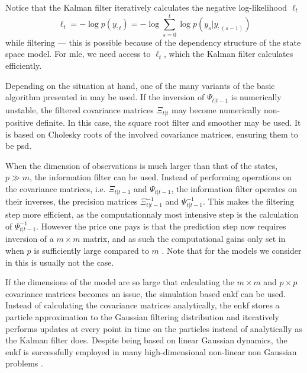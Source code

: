 Notice that the Kalman filter iteratively calculates the negative log-likelihood $\ell_{t}$  
$$\ell_{t} = - \log p(y_{:t}) = - \log \sum_{s = 0}^t \log p(y_{s} | y_{:(s - 1)})$$ 
while filtering --- this is possible because of the dependency structure of the state space model. For \acrshort{mle}, we need access to $\ell_{t}$, which the Kalman filter calculates efficiently.

Depending on the situation at hand, one of the many variants of the basic algorithm presented in  may be used. If the inversion of $\Psi_{t|t-1}$ is numerically unstable, the filtered covariance matrices $\Xi_{t|t}$ may become numerically non-positive definite. In this case, the square root filter and smoother \citep{Morf1975Squareroot} may be used. It is based on Cholesky roots of the involved covariance matrices, ensuring them to be \acrshort{psd}.

When the dimension of observations is much larger than that of the states, $p \gg m$, the information filter \citep{Fraser1969Optimum} can be used. Instead of performing operations on the covariance matrices, i.e. $\Xi_{t|t-1}$ and $\Psi_{t|t-1}$, the information filter operates on their inverses, the precision matrices $\Xi_{t|t - 1}^{-1}$ and $\Psi_{t|t-1}^{-1}$. This makes the filtering step more efficient, as the computationnaly most intensive step is the calculation of $\Psi_{t | t- 1}^{-1}$. However the price one pays is that the prediction step now requires inversion of a $m\times m$ matrix, and as such the computational gains only set in when $p$ is sufficiently large compared to $m$ . Note that for the models we consider in  this is usually not the case. 

If the dimensions of the model are so large that calculating the $m\times m$ and $p\times p$ covariance matrices becomes an issue, the simulation based \acrfull{enkf}  can be used. Instead of calculating the covariance matrices analytically, the \acrshort{enkf} stores a particle approximation to the Gaussian filtering distribution and iteratively performs updates at every point in time on the particles instead of analytically as the Kalman filter does. Despite being based on linear Gaussian dynamics, the \acrshort{enkf} is successfully employed in many high-dimensional non-linear non Gaussian problems \citep{Katzfuss2016Understanding}. 

